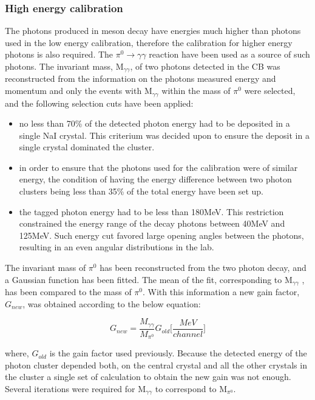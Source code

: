 \subsubsection{High energy calibration}

\indent The photons produced in meson decay have energies much higher than photons used in the low energy calibration, therefore the calibration for higher energy photons is also required. The $\pi^{0}\rightarrow\gamma\gamma$ reaction have been used as a source of such photons. The invariant mass, M$_{\gamma\gamma}$, of two photons detected in the CB was reconstructed from the information on the photons measured energy and momentum and only the events with M$_{\gamma\gamma}$ within the mass of $\pi^{0}$ were selected, and the following selection cuts have been applied:

\begin{itemize}
\item no less than 70\% of the detected photon energy had to be deposited in a single NaI crystal. This criterium was decided upon to ensure the deposit in a single crystal dominated the cluster.
\item in order to ensure that the photons used for the calibration were of similar energy, the condition of having the energy difference between two photon clusters being less than 35\% of the total energy have been set up.
\item the tagged photon energy had to be less than 180MeV. This restriction constrained the energy range of the decay photons between 40MeV and 125MeV. Such energy cut favored large opening angles between the photons, resulting in an even angular distributions in the lab.
\end{itemize}

\indent The invariant mass of $\pi^{0}$ has been reconstructed from the two photon decay, and a Gaussian function has been fitted. The mean of the fit, corresponding to M$_{\gamma\gamma}$ , has been compared to the mass of $\pi^{0}$. With this information a new gain factor, $G_{new}$, was obtained according to the below equation:

\begin{equation}
G_{new}=\frac{M_{\gamma\gamma}}{M_{\pi^{0}}}G_{old} \Big[\frac{MeV}{channel}\Big]
\end{equation}

where, $G_{old}$ is the gain factor used previously. Because the detected energy of the photon cluster depended both, on the central crystal and all the other crystals in the cluster a single set of calculation to obtain the new gain was not enough. Several iterations were required for M$_{\gamma\gamma}$ to correspond to M$_{\pi^{0}}$.

